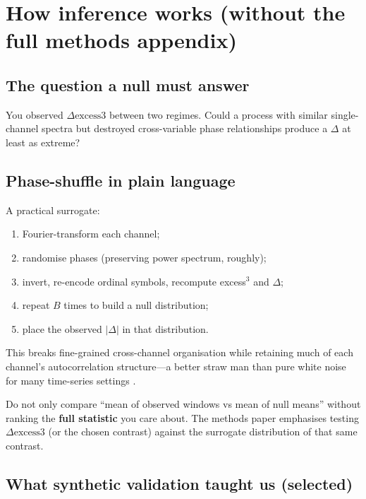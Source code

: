 \documentclass[11pt,a4paper]{article}
\begin{document}
\section{How inference works (without the full methods appendix)}
\label{sec:nulls}

\subsection{The question a null must answer}

You observed $\Delta\mathrm{excess3}$ between two regimes. Could a process
with similar single-channel spectra but destroyed cross-variable phase
relationships produce a $\Delta$ at least as extreme?

\subsection{Phase-shuffle in plain language}

A practical surrogate:
\begin{enumerate}[leftmargin=*,itemsep=2pt]
  \item Fourier-transform each channel;
  \item randomise phases (preserving power spectrum, roughly);
  \item invert, re-encode ordinal symbols, recompute excess$^3$ and
  $\Delta$;
  \item repeat $B$ times to build a null distribution;
  \item place the observed $|\Delta|$ in that distribution.
\end{enumerate}
This breaks fine-grained cross-channel organisation while retaining much of
each channel's autocorrelation structure---a better straw man than pure
white noise for many time-series settings
\citep{Schreiber2000,Padilla2026excess3}.

\begin{warningbox}
Do not only compare ``mean of observed windows vs mean of null means''
without ranking the \textbf{full statistic} you care about. The methods
paper emphasises testing $\Delta\mathrm{excess3}$ (or the chosen contrast)
against the surrogate distribution of that same contrast.
\end{warningbox}

\subsection{What synthetic validation taught us (selected)}
\end{document}
